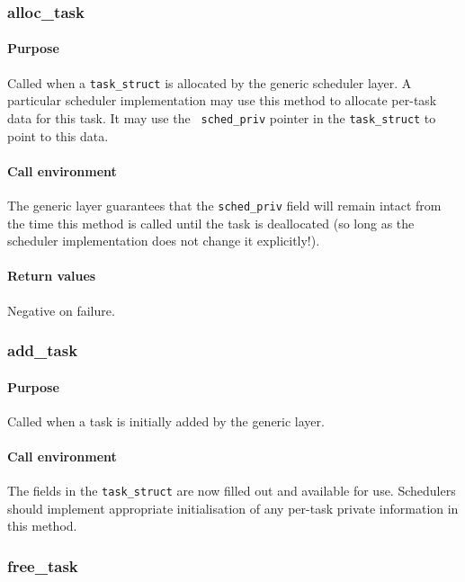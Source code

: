 \documentclass[11pt,twoside,final,openright]{xenstyle}
\begin{document}
\subsubsection{alloc\_task}

\paragraph*{Purpose}
Called when a {\tt task\_struct} is allocated by the generic scheduler
layer.  A particular scheduler implementation may use this method to
allocate per-task data for this task.  It may use the {\tt
sched\_priv} pointer in the {\tt task\_struct} to point to this data.

\paragraph*{Call environment}
The generic layer guarantees that the {\tt sched\_priv} field will
remain intact from the time this method is called until the task is
deallocated (so long as the scheduler implementation does not change
it explicitly!).

\paragraph*{Return values}
Negative on failure.

\subsubsection{add\_task}

\paragraph*{Purpose}

Called when a task is initially added by the generic layer.

\paragraph*{Call environment}

The fields in the {\tt task\_struct} are now filled out and available for use.
Schedulers should implement appropriate initialisation of any per-task private
information in this method.

\subsubsection{free\_task}
\end{document}
